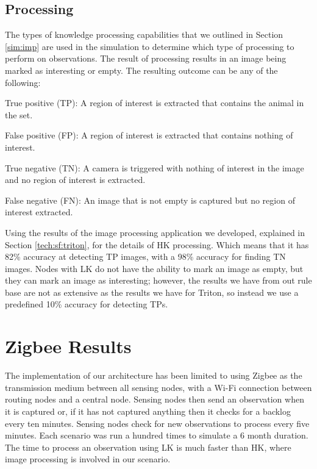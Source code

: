 \subsection{Processing}
	The types of knowledge processing capabilities that we outlined in Section \ref{sim:imp} are used in the simulation to determine which type of processing to perform on observations. The result of processing results in an image being marked as interesting or empty. The resulting outcome can be any of the following:
		\begin{description}
			\item True positive (TP): A region of interest is extracted that contains the animal in the set.
			\item False positive (FP): A region of interest is extracted that contains nothing of interest.
			\item True negative (TN): A camera is triggered with nothing of interest in the image and no region of interest is extracted.
			\item False negative (FN): An image that is not empty is captured but no region of interest extracted.
		\end{description}
	
	Using the results of the image processing application we developed, explained in Section \ref{tech:sf:triton}, for the details of HK processing. Which means that it has 82\% accuracy at detecting TP images, with a 98\% accuracy for finding TN images. Nodes with LK do not have the ability to mark an image as empty, but they can mark an image as interesting; however, the results we have from out rule base are not as extensive as the results we have for Triton, so instead we use a predefined 10\% accuracy for detecting TPs.
	

\section{Zigbee Results}
The implementation of our architecture has been limited to using Zigbee as the transmission medium between all sensing nodes, with a Wi-Fi connection between routing nodes and a central node. Sensing nodes then send an observation when it is captured or, if it has not captured anything then it checks for a backlog every ten minutes. Sensing nodes check for new observations to process every five minutes. Each scenario was run a hundred times to simulate a 6 month duration. The time to process an observation using LK is much faster than HK, where image processing is involved in our scenario.

